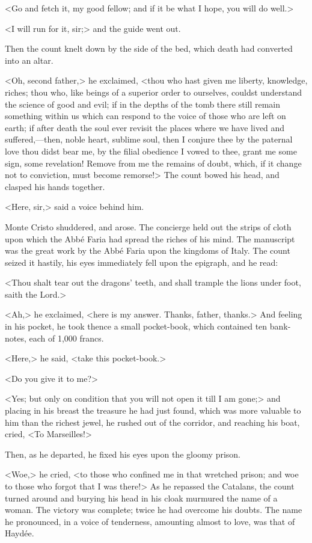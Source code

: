  <Go and fetch it, my good fellow; and if it be what I hope, you will do well.> 

 <I will run for it, sir;> and the guide went out. 

 Then the count knelt down by the side of the bed, which death had converted into an altar. 

 <Oh, second father,> he exclaimed, <thou who hast given me liberty, knowledge, riches; thou who, like beings of a superior order to ourselves, couldst understand the science of good and evil; if in the depths of the tomb there still remain something within us which can respond to the voice of those who are left on earth; if after death the soul ever revisit the places where we have lived and suffered,—then, noble heart, sublime soul, then I conjure thee by the paternal love thou didst bear me, by the filial obedience I vowed to thee, grant me some sign, some revelation! Remove from me the remains of doubt, which, if it change not to conviction, must become remorse!> The count bowed his head, and clasped his hands together. 

 <Here, sir,> said a voice behind him. 

 Monte Cristo shuddered, and arose. The concierge held out the strips of cloth upon which the Abbé Faria had spread the riches of his mind. The manuscript was the great work by the Abbé Faria upon the kingdoms of Italy. The count seized it hastily, his eyes immediately fell upon the epigraph, and he read: 

 <Thou shalt tear out the dragons' teeth, and shall trample the lions under foot, saith the Lord.> 

 <Ah,> he exclaimed, <here is my answer. Thanks, father, thanks.> And feeling in his pocket, he took thence a small pocket-book, which contained ten bank-notes, each of 1,000 francs. 

 <Here,> he said, <take this pocket-book.> 

 <Do you give it to me?> 

 <Yes; but only on condition that you will not open it till I am gone;> and placing in his breast the treasure he had just found, which was more valuable to him than the richest jewel, he rushed out of the corridor, and reaching his boat, cried, <To Marseilles!> 

 Then, as he departed, he fixed his eyes upon the gloomy prison. 

 <Woe,> he cried, <to those who confined me in that wretched prison; and woe to those who forgot that I was there!>  As he repassed the Catalans, the count turned around and burying his head in his cloak murmured the name of a woman. The victory was complete; twice he had overcome his doubts. The name he pronounced, in a voice of tenderness, amounting almost to love, was that of Haydée. 

